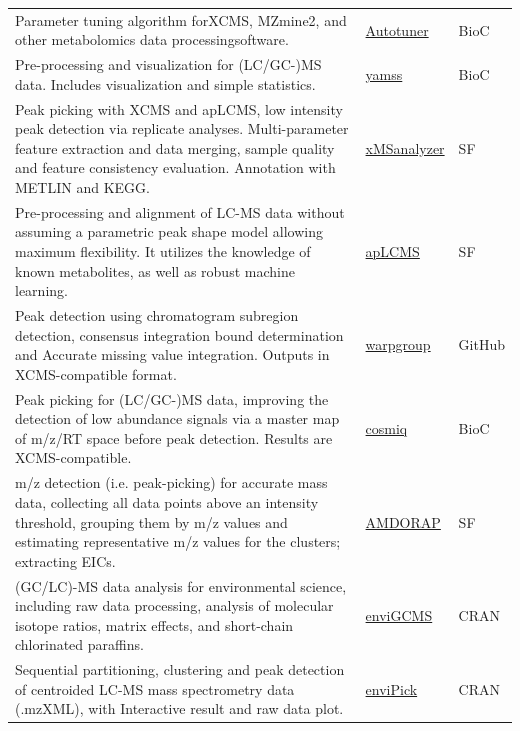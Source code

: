 \documentclass[]{article}
\begin{document}
\begin{longtable}[t]{>{\raggedright\arraybackslash}p{30em}>{\raggedright\arraybackslash}p{10em}>{\raggedright\arraybackslash}p{3em}}
\rowcolor{gray!6}  Parameter tuning algorithm forXCMS, MZmine2, and other metabolomics data processingsoftware. & \href{https://doi.org/doi:10.18129/B9.bioc.Autotuner}{Autotuner} & BioC\\
Pre-processing and visualization for (LC/GC-)MS data. Includes visualization and simple statistics. & \href{http://bioconductor.org/packages/release/bioc/html/yamss.html}{yamss} & BioC\\
\rowcolor{gray!6}  Peak picking with XCMS and apLCMS, low intensity peak detection via replicate analyses. Multi-parameter feature extraction and data merging, sample quality and feature consistency evaluation. Annotation with METLIN and KEGG. & \href{https://sourceforge.net/projects/xmsanalyzer/}{xMSanalyzer} & SF\\
Pre-processing and alignment of LC-MS data without assuming a parametric peak shape model allowing maximum flexibility. It utilizes the knowledge of known metabolites, as well as robust machine learning. & \href{http://web1.sph.emory.edu/apLCMS/}{apLCMS} & SF\\
\rowcolor{gray!6}  Peak detection using chromatogram subregion detection, consensus integration bound determination and Accurate missing value integration. Outputs in XCMS-compatible format. & \href{https://github.com/nathaniel-mahieu/warpgroup}{warpgroup} & GitHub\\
Peak picking for (LC/GC-)MS data, improving the detection of low abundance signals via a master map of m/z/RT space before peak detection. Results are XCMS-compatible. & \href{https://doi.org/doi:10.18129/B9.bioc.cosmiq}{cosmiq} & BioC\\
\rowcolor{gray!6}  m/z detection (i.e. peak-picking) for accurate mass data, collecting all data points above an intensity threshold, grouping them by m/z values and estimating representative m/z values for the clusters; extracting EICs. & \href{http://amdorap.sourceforge.net/}{AMDORAP} & SF\\
(GC/LC)-MS data analysis for environmental science, including raw data processing, analysis of molecular isotope ratios, matrix effects, and short-chain chlorinated paraffins. & \href{https://cran.r-project.org/web/packages/enviGCMS/index.html}{enviGCMS} & CRAN\\
\rowcolor{gray!6}  Sequential partitioning, clustering and peak detection of centroided LC-MS mass spectrometry data (.mzXML), with Interactive result and raw data plot. & \href{https://cran.r-project.org/web/packages/enviPick/index.html}{enviPick} & CRAN\\

\end{longtable}
\end{document}
